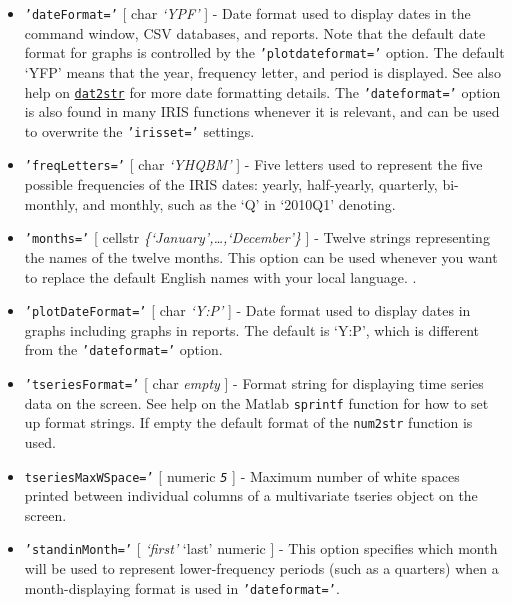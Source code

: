  \begin{itemize}
 \item
   \texttt{'dateFormat='} {[} char \textbar{} \emph{`YPF'} {]} - Date
   format used to display dates in the command window, CSV databases, and
   reports. Note that the default date format for graphs is controlled by
   the \texttt{'plotdateformat='} option. The default `YFP' means that
   the year, frequency letter, and period is displayed. See also help on
   \href{dates/dat2str}{\texttt{dat2str}} for more date formatting
   details. The \texttt{'dateformat='} option is also found in many IRIS
   functions whenever it is relevant, and can be used to overwrite the
   \texttt{'irisset='} settings.
 \item
   \texttt{'freqLetters='} {[} char \textbar{} \emph{`YHQBM'} {]} - Five
   letters used to represent the five possible frequencies of the IRIS
   dates: yearly, half-yearly, quarterly, bi-monthly, and monthly, such
   as the `Q' in `2010Q1' denoting.
 \item
   \texttt{'months='} {[} cellstr \textbar{}
   \emph{\{`January',\ldots{},`December'\}} {]} - Twelve strings
   representing the names of the twelve months. This option can be used
   whenever you want to replace the default English names with your local
   language. .
 \item
   \texttt{'plotDateFormat='} {[} char \textbar{} \emph{`Y:P'} {]} - Date
   format used to display dates in graphs including graphs in reports.
   The default is `Y:P', which is different from the
   \texttt{'dateformat='} option.
 \item
   \texttt{'tseriesFormat='} {[} char \textbar{} \emph{empty} {]} -
   Format string for displaying time series data on the screen. See help
   on the Matlab \texttt{sprintf} function for how to set up format
   strings. If empty the default format of the \texttt{num2str} function
   is used.
 \item
   \texttt{tseriesMaxWSpace='} {[} numeric \textbar{} \emph{\texttt{5}}
   {]} - Maximum number of white spaces printed between individual
   columns of a multivariate tseries object on the screen.
 \item
   \texttt{'standinMonth='} {[} \emph{`first'} \textbar{} `last'
   \textbar{} numeric {]} - This option specifies which month will be
   used to represent lower-frequency periods (such as a quarters) when a
   month-displaying format is used in \texttt{'dateformat='}.
 \end{itemize}
 
